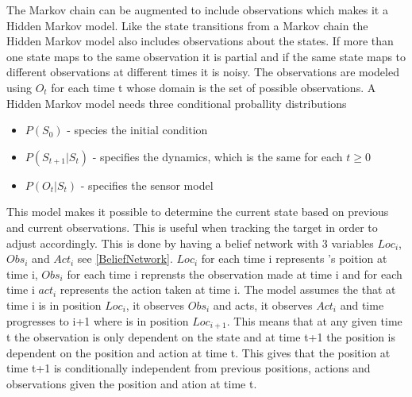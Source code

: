 The Markov chain can be augmented to include observations which makes it a
Hidden Markov model. Like the state transitions from a Markov chain the Hidden
Markov model also includes observations about the states. If more than one state
maps to the same observation it is partial and if the same state maps to
different observations at different times it is noisy. The observations are
modeled using $O_t$ for each time t whose domain is the set of possible
observations. A Hidden Markov model needs three conditional proballity
distributions
\begin{itemize}
  \item $P(S_0)$ - species the initial condition
  \item $P(S_{t+1}|S_t)$ - specifies the dynamics, which is the same for each $t
  \geq 0$
  \item $P(O_t|S_t)$ - specifies the sensor model
\end{itemize}

This model makes it possible to determine the current state based on previous
and current observations. This is useful when tracking the target in order to
adjust \namep accordingly. This is done by having a belief network with 3
variables $Loc_i$, $Obs_i$ and $Act_i$ see \autoref{BeliefNetwork}. $Loc_i$ for
each time i represents \name's poition at time i, $Obs_i$ for each time i reprensts the observation
made at time i and for each time i $act_i$ represents the action taken at time
i. The model assumes the that at time i \namep is in position $Loc_i$, it
observes $Obs_i$ and acts, it observes $Act_i$ and time progresses to i+1 where
\namep is in position $Loc_{i+1}$. This means that at any given time t the
observation is only dependent on the state and at time t+1 the position is
dependent on the position and action at time t. This gives that the position
at time t+1 is conditionally independent from previous positions, actions and
observations given the position and ation at time t. 

